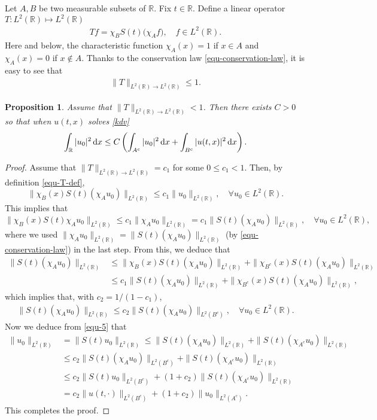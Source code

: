 \documentclass[12pt]{amsart}
\def\R {\mathbb{R}}
\def\d{{\,\rm d}}
\newtheorem{proposition}{Proposition}[section]
\theoremstyle{definition}
\numberwithin{equation}{section}
\begin{document}
Let $A,B$ be two measurable subsets of $\R$. Fix $t\in \R$. Define a linear operator $T:L^2(\R)\mapsto L^2(\R)$
\begin{align}\label{equ-T-def}
Tf = \chi_BS(t)\big( \chi_A f \big), \quad f\in L^2(\R).
\end{align}
Here and below, the characteristic function $\chi_A(x)=1$ if $x\in A$ and $\chi_A(x)=0$ if $x\notin A$. Thanks to the conservation law \eqref{equ-conservation-law}, it is easy to see that
\begin{align}\label{equ-T-norm}
\|T\|_{L^2(\R)\to L^2(\R)}\leq 1.
\end{align}



\begin{proposition}\label{prop-T}
Assume that $\|T\|_{L^2(\R)\to L^2(\R)}< 1$. Then there exists $C>0$ so that when $u(t,x)$ solves  \eqref{kdv}
$$
    \int_\R |u_0|^2\d x \leq C\left( \int_{A^c}|u_0|^2\d x + \int_{B^c}|u(t,x)|^2\d x \right).
$$
\end{proposition}
\begin{proof}
Assume that $\|T\|_{L^2(\R)\to L^2(\R)}=c_1$ for some $0\leq c_1<1$. Then, by definition \eqref{equ-T-def},
$$
\|\chi_B(x)S(t)(\chi_Au_0)\|_{L^2(\R)}\leq c_1\|u_0\|_{L^2(\R)}, \quad \forall u_0\in L^2(\R).
$$
This implies that
 $$
\|\chi_B(x)S(t) \chi_Au_0\|_{L^2(\R)}\leq c_1\|\chi_Au_0\|_{L^2(\R)}=c_1\|S(t) (\chi_Au_0)\|_{L^2(\R)}, \quad \forall u_0\in L^2(\R),
$$
where we used  $\|\chi_Au_0\|_{L^2(\R)}=\|S(t) (\chi_Au_0)\|_{L^2(\R)}$ (by \eqref{equ-conservation-law}) in the last step. From this, we deduce that
\begin{align*}
\|S(t) (\chi_Au_0)\|_{L^2(\R)}&\leq \|\chi_B(x)S(t) (\chi_Au_0)\|_{L^2(\R)}+\|\chi_{B^c}(x)S(t) (\chi_Au_0)\|_{L^2(\R)}\\
&\leq c_1\|S(t) (\chi_Au_0)\|_{L^2(\R)}+\|\chi_{B^c}(x)S(t) (\chi_Au_0)\|_{L^2(\R)},
\end{align*}
which implies that, with  $c_2=1/(1-c_1)$,
\begin{align}\label{equ-5}
 \|S(t) (\chi_Au_0)\|_{L^2(\R)}\leq c_2\|S(t) (\chi_Au_0)\|_{L^2(B^c)}, \quad \forall u_0\in L^2(\R).
\end{align}
Now we deduce from \eqref{equ-5} that
\begin{align*}
\|u_0\|_{L^2(\R)} &= \|S(t)u_0\|_{L^2(\R)}\leq \|S(t) (\chi_Au_0)\|_{L^2(\R)}+\|S(t) (\chi_{A^c}u_0)\|_{L^2(\R)}\\
&\leq c_2\|S(t) (\chi_Au_0)\|_{L^2(B^c)}+\|S(t) (\chi_{A^c}u_0)\|_{L^2(\R)}\\
&\leq c_2\|S(t)u_0\|_{L^2(B^c)}+(1+c_2)\|S(t) (\chi_{A^c}u_0)\|_{L^2(\R)}\\
&=c_2\|u(t,\cdot)\|_{L^2(B^c)}+(1+c_2)\|u_0\|_{L^2(A^c)}.
\end{align*}
This completes the proof.
\end{proof}
\end{document}
